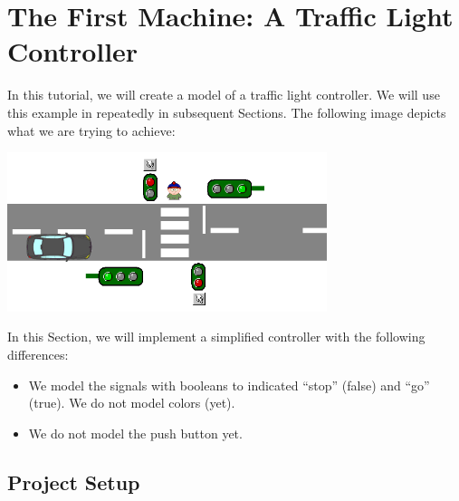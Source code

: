 \section{The First Machine: A Traffic Light Controller}
\label{tutorial_03}



In this tutorial, we will create a model of a traffic light controller.  We will use this example in repeatedly in subsequent Sections.  The following image depicts what we are trying to achieve:

\begin{center}
	\includegraphics[width=0.7\textwidth]{img/tutorial/trafficlight.png}
\end{center}

In this Section, we will implement a simplified controller with the following differences:
\begin{itemize}
	\item We model the signals with booleans to indicated ``stop'' (false) and ``go'' (true).  We do not model colors (yet).
	\item We do not model the push button yet.
\end{itemize}

\subsection{Project Setup}

